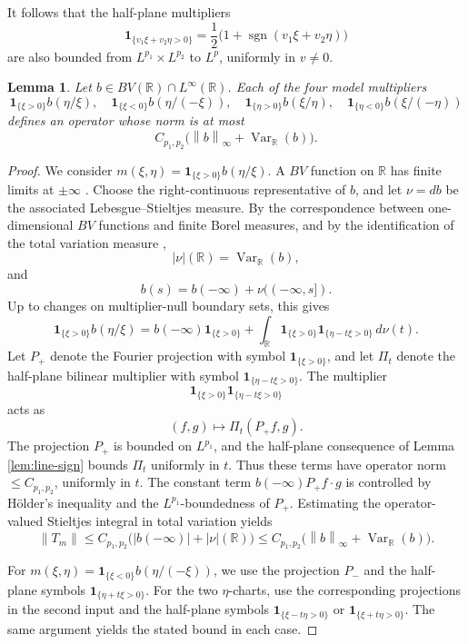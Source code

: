 \documentclass[11pt]{amsart}
\newtheorem{lemma}[definition]{Lemma}
\theoremstyle{remark}
\numberwithin{equation}{section}
\newcommand{\R}{\mathbb R}
\newcommand{\norm}[1]{\left\lVert #1\right\rVert}
\newcommand{\sgn}{\operatorname{sgn}}
\newcommand{\one}{\mathbf 1}
\newcommand{\Var}{\operatorname{Var}}
\begin{document}
	It follows that the half-plane multipliers
	\[
	\one_{\{v_1\xi+v_2\eta>0\}}
	=
	\frac12\bigl(1+\sgn(v_1\xi+v_2\eta)\bigr)
	\]
	are also bounded from \(L^{p_1}\times L^{p_2}\) to \(L^p\), uniformly in
	\(v\ne0\).
	
	\begin{lemma}\label{lem:one-chart-bv}
		Let \(b\in BV(\R)\cap L^\infty(\R)\).  Each of the four model multipliers
		\[
		\one_{\{\xi>0\}}b(\eta/\xi),\quad
		\one_{\{\xi<0\}}b(\eta/(-\xi)),\quad
		\one_{\{\eta>0\}}b(\xi/\eta),\quad
		\one_{\{\eta<0\}}b(\xi/(-\eta))
		\]
		defines an operator whose norm is at most
		\[
		C_{p_1,p_2}\bigl(\norm b_\infty+\Var_\R(b)\bigr).
		\]
	\end{lemma}
	
	\begin{proof}
		We consider \(m(\xi,\eta)=\one_{\{\xi>0\}}b(\eta/\xi)\).  A \(BV\) function on
		\(\R\) has finite limits at \(\pm\infty\)
		\cite[Theorem~3.27(c)]{Folland1999}.  Choose the right-continuous
		representative of \(b\), and let \(\nu=db\) be the associated
		Lebesgue--Stieltjes measure.  By the correspondence between
		one-dimensional \(BV\) functions and finite Borel measures, and by the
		identification of the total variation measure
		\cite[Theorem~3.29]{Folland1999},
		\[
		|\nu|(\R)=\Var_\R(b),
		\]
		and
		\[
		b(s)=b(-\infty)+\nu((-\infty,s]).
		\]
		Up to changes on multiplier-null boundary sets, this gives
		\[
		\one_{\{\xi>0\}}b(\eta/\xi)
		=
		b(-\infty)\one_{\{\xi>0\}}
		+
		\int_\R
		\one_{\{\xi>0\}}\one_{\{\eta-t\xi>0\}}\,d\nu(t).
		\]
		Let \(P_+\) denote the Fourier projection with symbol
		\(\one_{\{\xi>0\}}\), and let \(\Pi_t\) denote the half-plane bilinear
		multiplier with symbol \(\one_{\{\eta-t\xi>0\}}\).  The multiplier
		\[
		\one_{\{\xi>0\}}\one_{\{\eta-t\xi>0\}}
		\]
		acts as
		\[
		(f,g)\mapsto \Pi_t(P_+f,g).
		\]
		The projection \(P_+\) is bounded on \(L^{p_1}\), and the half-plane
		consequence of Lemma \ref{lem:line-sign} bounds \(\Pi_t\) uniformly in \(t\).
		Thus these terms have operator norm \(\le C_{p_1,p_2}\), uniformly in \(t\).
		The constant term
		\(b(-\infty)P_+f\cdot g\) is controlled by H\"older's inequality and the
		\(L^{p_1}\)-boundedness of \(P_+\).  Estimating the operator-valued Stieltjes
		integral in total variation yields
		\[
		\norm{T_m}
		\le
		C_{p_1,p_2}\bigl(|b(-\infty)|+|\nu|(\R)\bigr)
		\le
		C_{p_1,p_2}\bigl(\norm b_\infty+\Var_\R(b)\bigr).
		\]
		
		For \(m(\xi,\eta)=\one_{\{\xi<0\}}b(\eta/(-\xi))\), we use the projection
		\(P_-\) and the half-plane symbols \(\one_{\{\eta+t\xi>0\}}\).  For the two
		\(\eta\)-charts, use the corresponding projections in the second input and
		the half-plane symbols \(\one_{\{\xi-t\eta>0\}}\) or
		\(\one_{\{\xi+t\eta>0\}}\).  The same argument yields the stated bound in
		each case.
	\end{proof}
	
\end{document}
